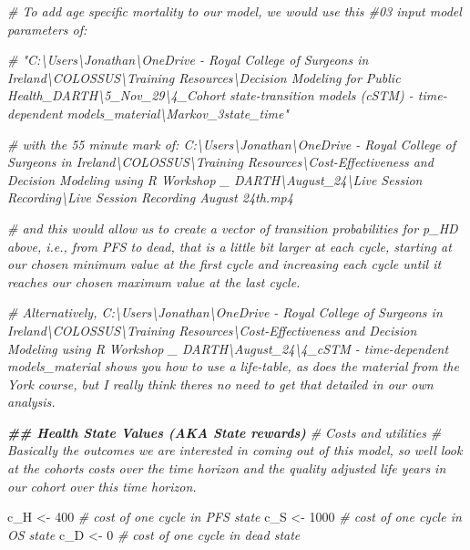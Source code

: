 \documentclass[
]{article}
\newenvironment{Shaded}{\begin{snugshade}}{\end{snugshade}}
\newcommand{\CommentTok}[1]{\textcolor[rgb]{0.56,0.35,0.01}{\textit{#1}}}
\newcommand{\DecValTok}[1]{\textcolor[rgb]{0.00,0.00,0.81}{#1}}
\newcommand{\DocumentationTok}[1]{\textcolor[rgb]{0.56,0.35,0.01}{\textbf{\textit{#1}}}}
\newcommand{\NormalTok}[1]{#1}
\newcommand{\OtherTok}[1]{\textcolor[rgb]{0.56,0.35,0.01}{#1}}
\begin{document}
\begin{Shaded}
\begin{Highlighting}[]
\CommentTok{\# To add age specific mortality to our model, we would use this \#03 input model parameters of:}

\CommentTok{\# "C:\textbackslash{}Users\textbackslash{}Jonathan\textbackslash{}OneDrive {-} Royal College of Surgeons in Ireland\textbackslash{}COLOSSUS\textbackslash{}Training Resources\textbackslash{}Decision Modeling for Public Health\_DARTH\textbackslash{}5\_Nov\_29\textbackslash{}4\_Cohort state{-}transition models (cSTM) {-} time{-}dependent models\_material\textbackslash{}Markov\_3state\_time"}

\CommentTok{\# with the 55 minute mark of: C:\textbackslash{}Users\textbackslash{}Jonathan\textbackslash{}OneDrive {-} Royal College of Surgeons in Ireland\textbackslash{}COLOSSUS\textbackslash{}Training Resources\textbackslash{}Cost{-}Effectiveness and Decision Modeling using R Workshop \_ DARTH\textbackslash{}August\_24\textbackslash{}Live Session Recording\textbackslash{}Live Session Recording August 24th.mp4}

\CommentTok{\# and this would allow us to create a vector of transition probabilities for p\_HD above, i.e., from PFS to dead, that is a little bit larger at each cycle, starting at our chosen minimum value at the first cycle and increasing each cycle until it reaches our chosen maximum value at the last cycle.}

\CommentTok{\# Alternatively, C:\textbackslash{}Users\textbackslash{}Jonathan\textbackslash{}OneDrive {-} Royal College of Surgeons in Ireland\textbackslash{}COLOSSUS\textbackslash{}Training Resources\textbackslash{}Cost{-}Effectiveness and Decision Modeling using R Workshop \_ DARTH\textbackslash{}August\_24\textbackslash{}4\_cSTM {-} time{-}dependent models\_material shows you how to use a life{-}table, as does the material from the York course, but I really think there\textquotesingle{}s no need to get that detailed in our own analysis.}




\DocumentationTok{\#\# Health State Values (AKA State rewards)}
\CommentTok{\# Costs and utilities  }
\CommentTok{\# Basically the outcomes we are interested in coming out of this model, so we\textquotesingle{}ll look at the cohorts costs over the time horizon and the quality adjusted life years in our cohort over this time horizon.}

\NormalTok{c\_H       }\OtherTok{\textless{}{-}} \DecValTok{400}   \CommentTok{\# cost of one cycle in PFS state}
\NormalTok{c\_S       }\OtherTok{\textless{}{-}} \DecValTok{1000}  \CommentTok{\# cost of one cycle in OS state}
\NormalTok{c\_D       }\OtherTok{\textless{}{-}} \DecValTok{0}     \CommentTok{\# cost of one cycle in dead state}


\end{Highlighting}
\end{Shaded}
\end{document}
